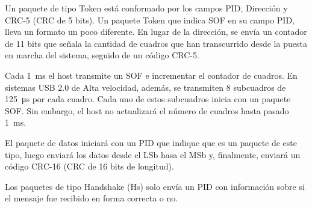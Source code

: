 	Un paquete de tipo Token está conformado por los campos PID, Dirección y CRC-5 (CRC de 5 bits). Un paquete Token que indica SOF en su campo PID, lleva un formato un poco diferente. En lugar de la dirección, se envía un contador de 11 bits que señala la cantidad de cuadros que han transcurrido desde la puesta en marcha del sistema, seguido de un código CRC-5.%
		
	Cada \SI{1}{\milli\second} el host transmite un SOF e incrementar el contador de cuadros. En sistemas USB 2.0 de Alta velocidad, además, se transmiten 8 subcuadros de \SI{125}{\micro\second} por cada cuadro. Cada uno de estos subcuadros inicia con un paquete SOF. Sin embargo, el host no actualizará el número de cuadros hasta pasado \SI{1}{\milli\second}.%
		
	El paquete de datos iniciará con un PID que indique que es un paquete de este tipo, luego enviará los datos desde el LSb hasa el MSb y, finalmente, enviará un código CRC-16 (CRC de 16 bits de longitud).%
		
	Los paquetes de tipo Handshake (Hs) solo envía un PID con información sobre si el mensaje fue recibido en forma correcta o no.